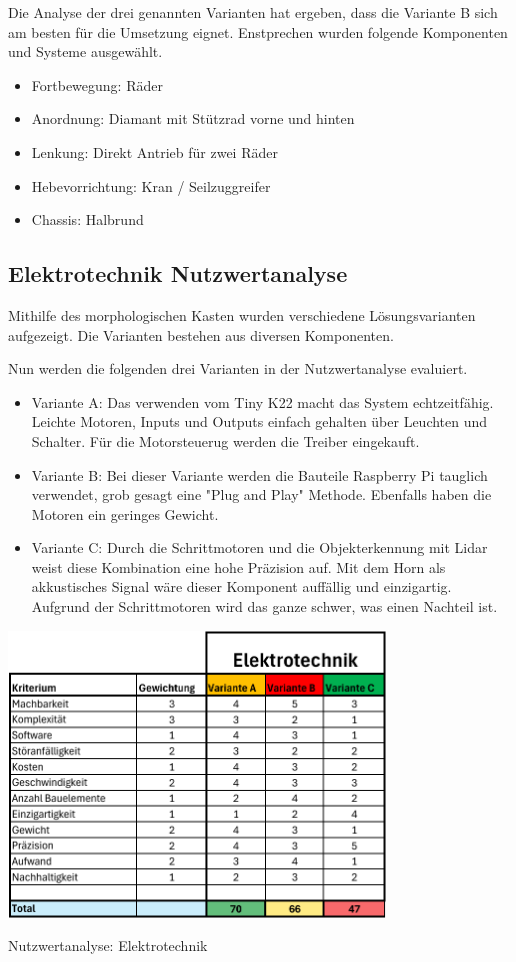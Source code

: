 Die Analyse der drei genannten Varianten hat ergeben, dass die Variante B sich am besten für die Umsetzung eignet. Enstprechen wurden folgende Komponenten und Systeme ausgewählt. 

\begin{itemize}
    \item Fortbewegung: Räder 
    \item Anordnung: Diamant mit Stützrad vorne und hinten
    \item Lenkung: Direkt Antrieb für zwei Räder
    \item Hebevorrichtung: Kran / Seilzuggreifer
    \item Chassis: Halbrund 
\end{itemize}

\subsection{Elektrotechnik Nutzwertanalyse}

Mithilfe des morphologischen Kasten wurden verschiedene Lösungsvarianten aufgezeigt. Die Varianten bestehen aus diversen Komponenten. 


Nun werden die folgenden drei Varianten in der Nutzwertanalyse evaluiert.

\begin{itemize}
    \item Variante A: Das verwenden vom Tiny K22 macht das System echtzeitfähig. Leichte Motoren, Inputs und Outputs einfach gehalten über Leuchten und Schalter. Für die Motorsteuerug werden die Treiber eingekauft.
    \item Variante B: Bei dieser Variante werden die Bauteile Raspberry Pi tauglich verwendet, grob gesagt eine "Plug and Play" Methode. Ebenfalls haben die Motoren ein geringes Gewicht.
    \item Variante C: Durch die Schrittmotoren und die Objekterkennung mit Lidar weist diese Kombination eine hohe Präzision auf. Mit dem Horn als akkustisches Signal wäre dieser Komponent auffällig und einzigartig. Aufgrund der Schrittmotoren wird das ganze schwer, was einen Nachteil ist.
\end{itemize}


\begin{table}[H]
\centering
\includegraphics[width=0.75\textwidth]{assets/Nutzwertanalyse-ET.pdf}
\caption{Nutzwertanalyse: Elektrotechnik}
\label{table:nutzwert-ET}
\end{table}

